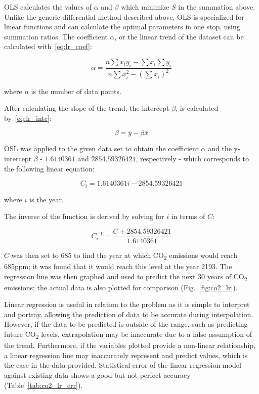 \documentclass{mcmthesis}
\begin{document}
    OLS calculates the values of $\alpha$ and $\beta$ which minimize $S$ in the summation above.
    Unlike the generic differential method described above, OLS is specialized for linear functions and can calculate the optimal parameters in one stop, using summation ratios.
    The coefficient $\alpha$, or the linear trend of the dataset can be calculated with~\eqref{eq:lr_coef}:

    \begin{equation}
        \alpha = \frac{n \sum x_i y_i - \sum x_i \sum y_i }{n \sum x^2_i - (\sum x_i)^2}
        \label{eq:lr_coef}
    \end{equation}

    \noindent where $n$ is the number of data points.

    After calculating the slope of the trend, the intercept $\beta$, is calculated by~\eqref{eq:lr_intc}:

    \begin{equation}
        \beta = \bar y - \beta \bar x
        \label{eq:lr_intc}
    \end{equation}

    OSL was applied to the given data set to obtain the coefficient $\alpha$ and the y-intercept $\beta$ - $1.6140361$ and $2854.59326421$, respectively - which corresponds to the following linear equation:

    \begin{equation}
        C_i = 1.6140361 i - 2854.59326421
        \label{eq:co2_lr}
    \end{equation}

    \noindent where $i$ is the year.

    The inverse of the function is derived by solving for $i$ in terms of $C$:

    \begin{equation}
        C^{-1}_i = \frac{C + 2854.59326421}{1.6140361}
        \label{eq:co2_lr_inv}
    \end{equation}

    $C$ was then set to 685 to find the year at which CO\textsubscript{2} emissions would reach 685ppm; it was found that it would reach this level at the year 2193.
    The regression line was then graphed and used to predict the next 30 years of CO\textsubscript{2} emissions; the actual data is also plotted for comparison (Fig.~\ref{fig:co2_lr}).


    Linear regression is useful in relation to the problem as it is simple to interpret and portray, allowing the prediction of data to be accurate during interpolation.
    However, if the data to be predicted is outside of the range, such as predicting future CO\textsubscript{2} levels, extrapolation may be inaccurate due to a false assumption of the trend.
    Furthermore, if the variables plotted provide a non-linear relationship, a linear regression line may inaccurately represent and predict values, which is the case in the data provided.
    Statistical error of the linear regression model against existing data shows a good but not perfect accuracy (Table~\ref{tab:co2_lr_err}).
\end{document}
